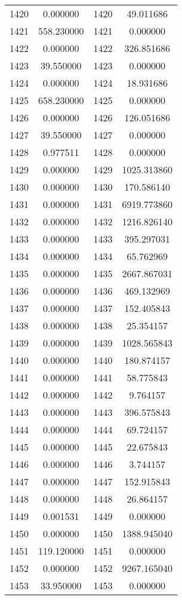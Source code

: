 \documentclass[12pt]{article}
\begin{document}
\begin{longtable}{@{}cccc@{}}
1420 & 0.000000 & 1420 & 49.011686 \\
1421 & 558.230000 & 1421 & 0.000000 \\
1422 & 0.000000 & 1422 & 326.851686 \\
1423 & 39.550000 & 1423 & 0.000000 \\
1424 & 0.000000 & 1424 & 18.931686 \\
1425 & 658.230000 & 1425 & 0.000000 \\
1426 & 0.000000 & 1426 & 126.051686 \\
1427 & 39.550000 & 1427 & 0.000000 \\
1428 & 0.977511 & 1428 & 0.000000 \\
1429 & 0.000000 & 1429 & 1025.313860 \\
1430 & 0.000000 & 1430 & 170.586140 \\
1431 & 0.000000 & 1431 & 6919.773860 \\
1432 & 0.000000 & 1432 & 1216.826140 \\
1433 & 0.000000 & 1433 & 395.297031 \\
1434 & 0.000000 & 1434 & 65.762969 \\
1435 & 0.000000 & 1435 & 2667.867031 \\
1436 & 0.000000 & 1436 & 469.132969 \\
1437 & 0.000000 & 1437 & 152.405843 \\
1438 & 0.000000 & 1438 & 25.354157 \\
1439 & 0.000000 & 1439 & 1028.565843 \\
1440 & 0.000000 & 1440 & 180.874157 \\
1441 & 0.000000 & 1441 & 58.775843 \\
1442 & 0.000000 & 1442 & 9.764157 \\
1443 & 0.000000 & 1443 & 396.575843 \\
1444 & 0.000000 & 1444 & 69.724157 \\
1445 & 0.000000 & 1445 & 22.675843 \\
1446 & 0.000000 & 1446 & 3.744157 \\
1447 & 0.000000 & 1447 & 152.915843 \\
1448 & 0.000000 & 1448 & 26.864157 \\
1449 & 0.001531 & 1449 & 0.000000 \\
1450 & 0.000000 & 1450 & 1388.945040 \\
1451 & 119.120000 & 1451 & 0.000000 \\
1452 & 0.000000 & 1452 & 9267.165040 \\
1453 & 33.950000 & 1453 & 0.000000 \\

\end{longtable}
\end{document}
